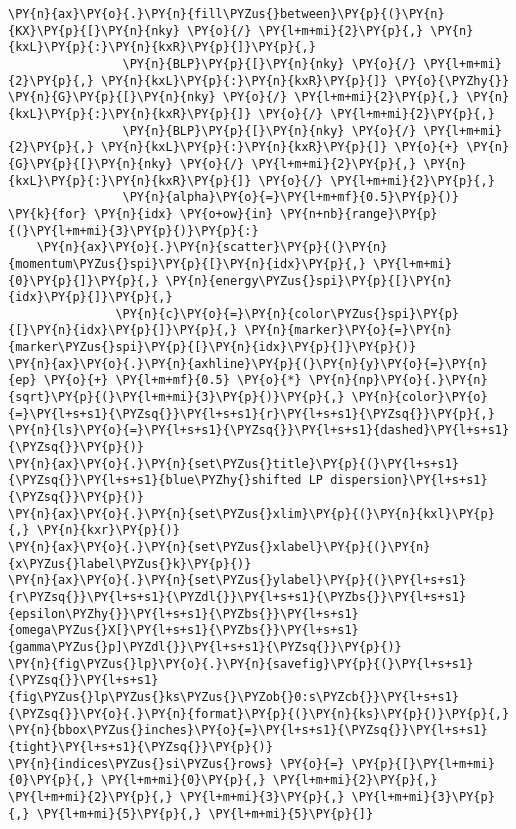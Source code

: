 \begin{Verbatim}[commandchars=\\\{\}]
\PY{n}{ax}\PY{o}{.}\PY{n}{fill\PYZus{}between}\PY{p}{(}\PY{n}{KX}\PY{p}{[}\PY{n}{nky} \PY{o}{/} \PY{l+m+mi}{2}\PY{p}{,} \PY{n}{kxL}\PY{p}{:}\PY{n}{kxR}\PY{p}{]}\PY{p}{,}
                \PY{n}{BLP}\PY{p}{[}\PY{n}{nky} \PY{o}{/} \PY{l+m+mi}{2}\PY{p}{,} \PY{n}{kxL}\PY{p}{:}\PY{n}{kxR}\PY{p}{]} \PY{o}{\PYZhy{}} \PY{n}{G}\PY{p}{[}\PY{n}{nky} \PY{o}{/} \PY{l+m+mi}{2}\PY{p}{,} \PY{n}{kxL}\PY{p}{:}\PY{n}{kxR}\PY{p}{]} \PY{o}{/} \PY{l+m+mi}{2}\PY{p}{,}
                \PY{n}{BLP}\PY{p}{[}\PY{n}{nky} \PY{o}{/} \PY{l+m+mi}{2}\PY{p}{,} \PY{n}{kxL}\PY{p}{:}\PY{n}{kxR}\PY{p}{]} \PY{o}{+} \PY{n}{G}\PY{p}{[}\PY{n}{nky} \PY{o}{/} \PY{l+m+mi}{2}\PY{p}{,} \PY{n}{kxL}\PY{p}{:}\PY{n}{kxR}\PY{p}{]} \PY{o}{/} \PY{l+m+mi}{2}\PY{p}{,}
                \PY{n}{alpha}\PY{o}{=}\PY{l+m+mf}{0.5}\PY{p}{)}
\PY{k}{for} \PY{n}{idx} \PY{o+ow}{in} \PY{n+nb}{range}\PY{p}{(}\PY{l+m+mi}{3}\PY{p}{)}\PY{p}{:}
    \PY{n}{ax}\PY{o}{.}\PY{n}{scatter}\PY{p}{(}\PY{n}{momentum\PYZus{}spi}\PY{p}{[}\PY{n}{idx}\PY{p}{,} \PY{l+m+mi}{0}\PY{p}{]}\PY{p}{,} \PY{n}{energy\PYZus{}spi}\PY{p}{[}\PY{n}{idx}\PY{p}{]}\PY{p}{,}
               \PY{n}{c}\PY{o}{=}\PY{n}{color\PYZus{}spi}\PY{p}{[}\PY{n}{idx}\PY{p}{]}\PY{p}{,} \PY{n}{marker}\PY{o}{=}\PY{n}{marker\PYZus{}spi}\PY{p}{[}\PY{n}{idx}\PY{p}{]}\PY{p}{)}
\PY{n}{ax}\PY{o}{.}\PY{n}{axhline}\PY{p}{(}\PY{n}{y}\PY{o}{=}\PY{n}{ep} \PY{o}{+} \PY{l+m+mf}{0.5} \PY{o}{*} \PY{n}{np}\PY{o}{.}\PY{n}{sqrt}\PY{p}{(}\PY{l+m+mi}{3}\PY{p}{)}\PY{p}{,} \PY{n}{color}\PY{o}{=}\PY{l+s+s1}{\PYZsq{}}\PY{l+s+s1}{r}\PY{l+s+s1}{\PYZsq{}}\PY{p}{,} \PY{n}{ls}\PY{o}{=}\PY{l+s+s1}{\PYZsq{}}\PY{l+s+s1}{dashed}\PY{l+s+s1}{\PYZsq{}}\PY{p}{)}
\PY{n}{ax}\PY{o}{.}\PY{n}{set\PYZus{}title}\PY{p}{(}\PY{l+s+s1}{\PYZsq{}}\PY{l+s+s1}{blue\PYZhy{}shifted LP dispersion}\PY{l+s+s1}{\PYZsq{}}\PY{p}{)}
\PY{n}{ax}\PY{o}{.}\PY{n}{set\PYZus{}xlim}\PY{p}{(}\PY{n}{kxl}\PY{p}{,} \PY{n}{kxr}\PY{p}{)}
\PY{n}{ax}\PY{o}{.}\PY{n}{set\PYZus{}xlabel}\PY{p}{(}\PY{n}{x\PYZus{}label\PYZus{}k}\PY{p}{)}
\PY{n}{ax}\PY{o}{.}\PY{n}{set\PYZus{}ylabel}\PY{p}{(}\PY{l+s+s1}{r\PYZsq{}}\PY{l+s+s1}{\PYZdl{}}\PY{l+s+s1}{\PYZbs{}}\PY{l+s+s1}{epsilon\PYZhy{}}\PY{l+s+s1}{\PYZbs{}}\PY{l+s+s1}{omega\PYZus{}X[}\PY{l+s+s1}{\PYZbs{}}\PY{l+s+s1}{gamma\PYZus{}p]\PYZdl{}}\PY{l+s+s1}{\PYZsq{}}\PY{p}{)}
\PY{n}{fig\PYZus{}lp}\PY{o}{.}\PY{n}{savefig}\PY{p}{(}\PY{l+s+s1}{\PYZsq{}}\PY{l+s+s1}{fig\PYZus{}lp\PYZus{}ks\PYZus{}\PYZob{}0:s\PYZcb{}}\PY{l+s+s1}{\PYZsq{}}\PY{o}{.}\PY{n}{format}\PY{p}{(}\PY{n}{ks}\PY{p}{)}\PY{p}{,} \PY{n}{bbox\PYZus{}inches}\PY{o}{=}\PY{l+s+s1}{\PYZsq{}}\PY{l+s+s1}{tight}\PY{l+s+s1}{\PYZsq{}}\PY{p}{)}
\PY{n}{indices\PYZus{}si\PYZus{}rows} \PY{o}{=} \PY{p}{[}\PY{l+m+mi}{0}\PY{p}{,} \PY{l+m+mi}{0}\PY{p}{,} \PY{l+m+mi}{2}\PY{p}{,} \PY{l+m+mi}{2}\PY{p}{,} \PY{l+m+mi}{3}\PY{p}{,} \PY{l+m+mi}{3}\PY{p}{,} \PY{l+m+mi}{5}\PY{p}{,} \PY{l+m+mi}{5}\PY{p}{]}

\end{Verbatim}
